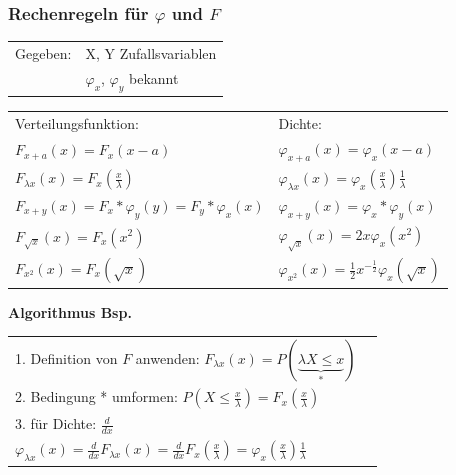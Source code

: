 	\subsubsection{Rechenregeln für $\varphi$ und $F$ }
		\begin{minipage}{11cm}
			\begin{tabular}{ll}
        	Gegeben: &X, Y Zufallsvariablen\\
        	&$\varphi_x$, $\varphi_y$ bekannt\\
        	\end{tabular}
 
        	\begin{tabular}{p{6cm}p{6cm}}
        	Verteilungsfunktion: &Dichte:\\
        	$F_{x+a}(x)=F_x(x-a)$  &$\varphi_{x+a}(x)=\varphi_x(x-a)$\\
        	$F_{\lambda x}(x)=F_x(\frac{x}{\lambda})$ &$\varphi_{\lambda
        	x}(x)=\varphi_x(\frac{x}{\lambda})\frac{1}{\lambda}$\\
        	$F_{x+y}(x)=F_x\ast\varphi_y(y)=F_y\ast\varphi_x(x)$ &
        	$\varphi_{x+y}(x)=\varphi_x\ast\varphi_y(x)$\\
        	$F_{\sqrt{x}}(x)=F_x(x^2)$ &
        	$\varphi_{\sqrt{x}}(x)=2x\varphi_x(x^2)$\\
        	$F_{x^2}(x)=F_x(\sqrt{x})$ &
        	$\varphi_{x^2}(x)=\frac{1}{2}x^{-\frac{1}{2}}\varphi_x(\sqrt{x})$
        	\end{tabular}
		\end{minipage}
		\begin{minipage}{7cm}
        	\textbf{Algorithmus Bsp.}
        	\begin{tabular}{ll}
        	1. Definition von $F$ anwenden: $F_{\lambda x}(x)=P(\underbrace
        	{\lambda X\leq x}_{*})$\\ 
        	2. Bedingung * umformen: $P(X \leq
        	\frac{x}{\lambda})=F_x(\frac{x}{\lambda})$\\ 
        	3. für Dichte: $\frac{d}{dx}$\\
        	\vspace{3mm}
        	$\varphi_{\lambda x}(x)=\frac{d}{dx}F_{\lambda
        	x}(x)=\frac{d}{dx}F_x(\frac{x}{\lambda})=
        	\varphi_x(\frac{x}{\lambda})\frac{1}{\lambda}$
        	\end{tabular}
			\vspace{10mm}
        \end{minipage}

        
        

